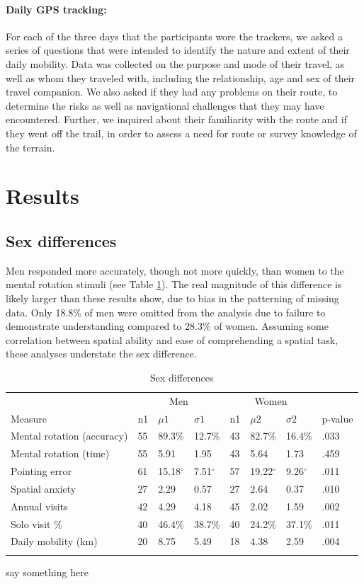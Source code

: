\paragraph{Daily GPS tracking:}  For each of the three days that the participants wore the trackers, we asked a series of questions that were intended to identify the nature and extent of their daily mobility. Data was collected on the purpose and mode of their travel, as well as whom they traveled with, including the relationship, age and sex of their travel companion. We also asked if they had any problems on their route, to determine the risks as well as navigational challenges that they may have encountered. Further, we inquired about their familiarity with the route and if they went off the trail, in order to assess a need for route or survey knowledge of the terrain.  

\section{Results}
\label{sec:3}
	\subsection{Sex differences}
	\label{sec:3.1}
Men responded more accurately, though not more quickly, than women to the mental rotation stimuli (see Table \ref{tab:sex}).  The real magnitude of this difference is likely larger than these results show, due to bias in the patterning of missing data.  Only 18.8\% of men were omitted from the analysis due to failure to demonstrate understanding compared to 28.3\% of women.  Assuming some correlation between spatial ability and ease of comprehending a spatial task, these analyses understate the sex difference.  

\begin{table}[h!]
\caption{Sex differences}
\label{tab:sex}  
\begin{tabular}{llllllll}
\hline\noalign{\smallskip}
& \multicolumn{3}{c}{Men} & \multicolumn{3}{c}{Women} & \\
Measure & n1 & $\mu1$ & $\sigma1$ & n1 & $\mu2$ & $\sigma2$ & p-value \\
\noalign{\smallskip}\hline\noalign{\smallskip}
Mental rotation (accuracy) & 55 & 89.3\% & 12.7\% & 43 & 82.7\% & 16.4\% & .033 \\
Mental rotation (time) & 55 & 5.91 & 1.95 & 43 & 5.64 & 1.73 & .459 \\
Pointing error & 61 & 15.18$^{\circ}$ & 7.51$^{\circ}$ & 57 & 19.22$^{\circ}$ & 9.26$^{\circ}$ & .011 \\
Spatial anxiety & 27 & 2.29 & 0.57 & 27 & 2.64& 0.37 & .010 \\
Annual visits & 42 & 4.29 & 4.18 & 45 & 2.02 & 1.59 & .002 \\
Solo visit \% & 40 & 46.4\% & 38.7\% & 40 & 24.2\% & 37.1\% & .011 \\
Daily mobility (km) & 20 & 8.75 & 5.49 & 18 & 4.38 & 2.59 & .004 \\
\noalign{\smallskip}\hline
\end{tabular}\par
\bigskip
say something here
\end{table}		  

